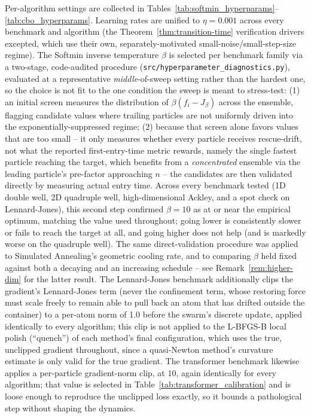 \documentclass{article}
\theoremstyle{plain}
\theoremstyle{definition}
\theoremstyle{remark}
\begin{document}
Per-algorithm settings are collected in Tables~\ref{tab:softmin_hyperparams}--\ref{tab:cbo_hyperparams}. Learning rates are unified to $\eta=0.001$ across every benchmark and algorithm (the Theorem~\ref{thm:transition-time} verification drivers excepted, which use their own, separately-motivated small-noise/small-step-size regime). The Softmin inverse temperature $\beta$ is selected per benchmark family via a two-stage, code-audited procedure (\texttt{src/hyperparameter\_diagnostics.py}), evaluated at a representative \emph{middle}-of-sweep setting rather than the hardest one, so the choice is not fit to the one condition the sweep is meant to stress-test: (1) an initial screen measures the distribution of $\beta(f_i-J_\beta)$ across the ensemble, flagging candidate values where trailing particles are not uniformly driven into the exponentially-suppressed regime; (2) because that screen alone favors values that are too small -- it only measures whether every particle receives rescue-drift, not what the reported first-entry-time metric rewards, namely the single fastest particle reaching the target, which benefits from a \emph{concentrated} ensemble via the leading particle's pre-factor approaching $n$ -- the candidates are then validated directly by measuring actual entry time. Across every benchmark tested (1D double well, 2D quadruple well, high-dimensional Ackley, and a spot check on Lennard-Jones), this second step confirmed $\beta=10$ as at or near the empirical optimum, matching the value used throughout; going lower is consistently slower or fails to reach the target at all, and going higher does not help (and is markedly worse on the quadruple well). The same direct-validation procedure was applied to Simulated Annealing's geometric cooling rate, and to comparing $\beta$ held fixed against both a decaying and an increasing schedule -- see Remark~\ref{rem:higher-dim} for the latter result. The Lennard-Jones benchmark additionally clips the gradient's Lennard-Jones term (never the confinement term, whose restoring force must scale freely to remain able to pull back an atom that has drifted outside the container) to a per-atom norm of 1.0 before the swarm's discrete update, applied identically to every algorithm; this clip is not applied to the L-BFGS-B local polish (``quench'') of each method's final configuration, which uses the true, unclipped gradient throughout, since a quasi-Newton method's curvature estimate is only valid for the true gradient. The transformer benchmark likewise applies a per-particle gradient-norm clip, at $10$, again identically for every algorithm; that value is selected in Table~\ref{tab:transformer_calibration} and is loose enough to reproduce the unclipped loss exactly, so it bounds a pathological step without shaping the dynamics.
\end{document}
